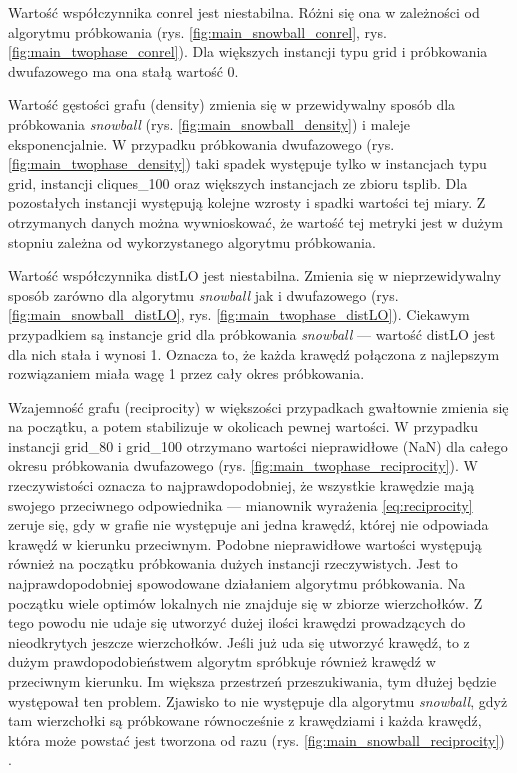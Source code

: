 Wartość współczynnika conrel jest niestabilna. Różni się ona w zależności od algorytmu próbkowania (rys. \ref{fig:main_snowball_conrel}, rys. \ref{fig:main_twophase_conrel}).
Dla większych instancji typu grid i próbkowania dwufazowego ma ona stałą wartość 0.

Wartość gęstości grafu (density) zmienia się w przewidywalny sposób dla próbkowania \textit{snowball} (rys. \ref{fig:main_snowball_density}) i maleje eksponencjalnie.
W przypadku próbkowania dwufazowego (rys. \ref{fig:main_twophase_density}) taki spadek występuje tylko w instancjach typu grid, instancji cliques\_100 oraz większych
instancjach ze zbioru tsplib.
Dla pozostałych instancji występują kolejne wzrosty i spadki wartości tej miary.
Z otrzymanych danych można wywnioskować, że wartość tej metryki jest w dużym stopniu zależna od wykorzystanego algorytmu próbkowania.

Wartość współczynnika distLO jest niestabilna. Zmienia się w nieprzewidywalny sposób zarówno dla algorytmu \textit{snowball} jak i dwufazowego (rys. \ref{fig:main_snowball_distLO}, rys. \ref{fig:main_twophase_distLO}).
Ciekawym przypadkiem są instancje grid dla próbkowania \textit{snowball} --- wartość distLO jest dla nich stała i wynosi 1. Oznacza to, że każda krawędź połączona
z najlepszym rozwiązaniem miała wagę 1 przez cały okres próbkowania.

Wzajemność grafu (reciprocity) w większości przypadkach gwałtownie zmienia się na początku, a potem stabilizuje w okolicach pewnej wartości.
W przypadku instancji grid\_80 i grid\_100 otrzymano wartości nieprawidłowe (NaN) dla całego okresu próbkowania dwufazowego (rys. \ref{fig:main_twophase_reciprocity}). W rzeczywistości oznacza to
najprawdopodobniej, że wszystkie krawędzie mają swojego przeciwnego odpowiednika --- mianownik wyrażenia \ref{eq:reciprocity} zeruje się, gdy w grafie nie występuje ani jedna krawędź,
której nie odpowiada krawędź w kierunku przeciwnym. Podobne nieprawidłowe wartości występują również na początku próbkowania dużych instancji rzeczywistych.
Jest to najprawdopodobniej spowodowane działaniem algorytmu próbkowania. Na początku wiele optimów lokalnych nie znajduje się w zbiorze wierzchołków.
Z tego powodu nie udaje się utworzyć dużej ilości krawędzi prowadzących do nieodkrytych jeszcze wierzchołków.
Jeśli już uda się utworzyć krawędź, to z dużym prawdopodobieństwem algorytm spróbkuje również krawędź w przeciwnym kierunku.
Im większa przestrzeń przeszukiwania, tym dłużej będzie występował ten problem.
Zjawisko to nie występuje dla algorytmu \textit{snowball}, gdyż tam wierzchołki są próbkowane równocześnie z krawędziami i każda krawędź, która może powstać jest
tworzona od razu (rys. \ref{fig:main_snowball_reciprocity}) .

